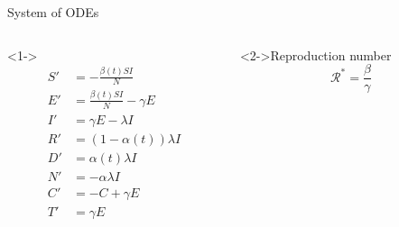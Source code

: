 \begin{frame}{System of ODEs}
    \begin{columns}
        \begin{column}{0.5\linewidth}
            \begin{definition}<1->
                \begin{equation*}
                    \begin{aligned}
                        S' &= - \frac{\beta(t) SI}{N} \\
                        E' &= \frac{\beta(t) SI}{N} - \gamma E \\
                        I' &= \gamma E - \lambda I \\
                        R' &= (1 - \alpha(t)) \lambda I \\
                        D' &= \alpha(t) \lambda I \\
                        N' &= - \alpha \lambda I \\
                        C' &= -C + \gamma E \\
                        T' &= \gamma E \\
                    \end{aligned}
                \end{equation*}
            \end{definition}
        \end{column}
        \begin{column}{0.5\linewidth}
            \begin{block}<2->{Reproduction number}
                \begin{equation*}
                    \mathcal{R}^* = \frac{\beta}{\gamma}
                \end{equation*}
            \end{block}
        \end{column}
    \end{columns}
\end{frame}

